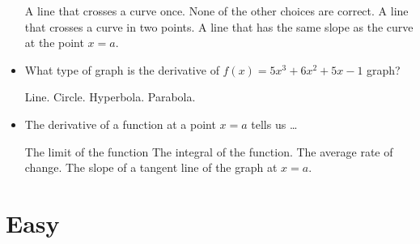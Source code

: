 \documentclass{exam}
\begin{document}
\begin{itemize}
	\begin{choices}
		\choice A line that crosses a  curve once.
		\choice None of the other choices are correct.
		\choice A line that crosses a curve in two points.
		\CorrectChoice A line that has the same slope as the curve at the point $x = a$.
	\end{choices}
	\item What type of graph is the derivative of $f(x)= 5x^3+6x^2+5x-1$ graph?

	\begin{choices}
		\choice Line.
		\choice Circle.
		\choice Hyperbola.
		\CorrectChoice Parabola.
	\end{choices}
	\item The derivative of a function at a point $x = a$ tells us \ldots

	\begin{choices}
		\choice The limit of the function
		\choice The integral of the function.
		\choice The average rate of change.
		\CorrectChoice The slope of a tangent line of the graph at $x = a$.
	\end{choices}

\end{itemize}

\section{Easy}
\end{document}
